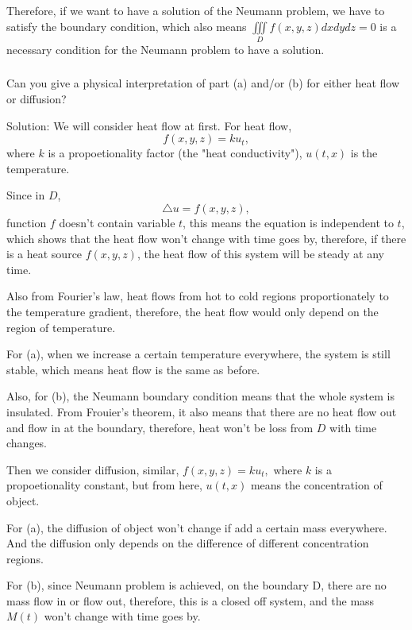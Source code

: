 \documentclass{article}
\begin{document}
			Therefore, if we want to have a solution of the Neumann problem, we have to satisfy the boundary condition, which also means $ \iiint\limits_{D}^{} f(x,y,z)dxdydz=0$ is a necessary condition for the Neumann problem to have a solution.
		\subsubsection{}
	Can you give a physical interpretation of part (a) and/or (b) for either heat flow or diffusion?
		
		Solution: We will consider heat flow at first. For heat flow, \[f(x,y,z)=ku_{t},\]
		where $k$ is a propoetionality factor (the "heat conductivity"), $u(t,x)$ is the temperature.
        
		Since in $D$, \[\triangle u = f(x,y,z),\] function $f$ doesn't contain variable $t$, this means the equation is independent to $t$, which shows that the heat flow won't change with time goes by, therefore, if there is a heat source $f(x,y,z)$, the heat flow of this system will be steady at any time. 
		
		Also from Fourier's law, heat flows from hot to cold regions proportionately to the temperature gradient, therefore, the heat flow would only depend on the region of temperature.
         
		For (a), when we increase a certain temperature everywhere, the system is still stable, which means heat flow is the same as before. 

		Also, for (b), the Neumann boundary condition means that the whole system is insulated. From Frouier's theorem, it also means that there are no heat flow out and flow in at the boundary, therefore, heat won't be loss from $D$ with time changes.

		Then we consider diffusion, similar, $f(x,y,z)=ku_{t},$ where $k$ is a propoetionality constant, but from here, $u(t,x)$ means the concentration of object.
		
		For (a), the diffusion of object won't change if add a certain mass everywhere. And the diffusion only depends on the difference of different concentration regions.

		For (b), since Neumann problem is achieved, on the boundary D, there are no mass flow in or flow out, therefore, this is a closed off system, and the mass $M(t)$ won't change with time goes by.  
\end{document}
